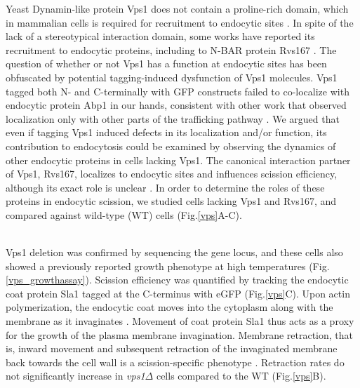 \documentclass[9pt,lineno]{elife}
\begin{document}
Yeast Dynamin-like protein Vps1 does not contain a proline-rich domain, which in mammalian cells is required for recruitment to endocytic sites \citep{Grabs1997,Cestra1999,Farsad2001,Meinecke2013b}. In spite of the lack of a stereotypical interaction domain, some works have reported its recruitment to endocytic proteins, including to N-BAR protein Rvs167 \citep{Yu2004,Nannapaneni2010b,Rooij2010}. The question of whether or not Vps1 has a function at endocytic sites has been obfuscated by potential tagging-induced dysfunction of Vps1 molecules. Vps1 tagged both N- and C-terminally with GFP constructs failed to co-localize with endocytic protein Abp1 in our hands, consistent with other work that observed localization only with other parts of the trafficking pathway \citep{GoudGadila2017}. We argued that even if tagging Vps1 induced defects in its localization and/or function, its contribution to endocytosis could be examined by observing the dynamics of other endocytic proteins in cells lacking Vps1. The canonical interaction partner of Vps1, Rvs167, localizes to endocytic sites and influences scission efficiency, although its exact role is unclear \citep{Kukulski2012,Picco2015}. In order to determine the roles of these proteins in endocytic scission, we studied cells lacking Vps1 and Rvs167, and compared against wild-type (WT) cells (Fig.\ref{vps}A-C).

~\\
Vps1 deletion was confirmed by sequencing the gene locus, and these cells also showed a previously reported \citep{Rothman1986}  growth phenotype at high temperatures (Fig.\ref{vps_growthassay}). Scission efficiency was quantified by tracking the endocytic coat protein Sla1 tagged at the C-terminus with eGFP (Fig.\ref{vps}C). Upon actin polymerization, the endocytic coat moves into the cytoplasm along with the membrane as it invaginates \citep{Skruzny2012}. Movement of coat protein Sla1 thus acts as a proxy for the growth of the plasma membrane invagination. Membrane retraction, that is, inward movement and subsequent retraction of the invaginated membrane back towards the cell wall is a scission-specific phenotype \citep{Kaksonen2005}. Retraction rates do not significantly increase in  \textit{vps1$\Delta$} cells compared to the WT (Fig.\ref{vps}B).
\end{document}

